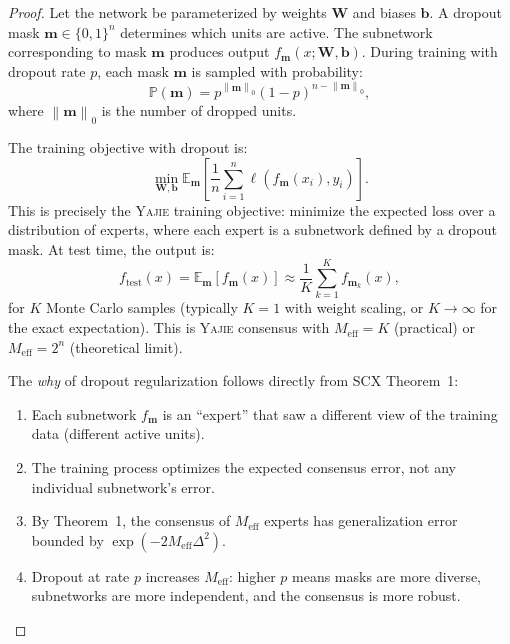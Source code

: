 \documentclass[12pt,a4paper]{article}
\theoremstyle{definition}
\newcommand{\Yajie}{\textsc{Yajie}}
\newcommand{\SCX}{\textsc{SCX}}
\newcommand{\E}{\mathbb{E}}
\newcommand{\Pbb}{\mathbb{P}}
\newcommand{\norm}[1]{\left\lVert#1\right\rVert}
\begin{document}
\begin{proof}
Let the network be parameterized by weights $\mathbf{W}$ and biases $\mathbf{b}$. A dropout mask $\mathbf{m} \in \{0,1\}^n$ determines which units are active. The subnetwork corresponding to mask $\mathbf{m}$ produces output $f_{\mathbf{m}}(x; \mathbf{W}, \mathbf{b})$. During training with dropout rate $p$, each mask $\mathbf{m}$ is sampled with probability:
\begin{equation}
    \Pbb(\mathbf{m}) = p^{\norm{\mathbf{m}}_0} (1-p)^{n - \norm{\mathbf{m}}_0},
\end{equation}
where $\norm{\mathbf{m}}_0$ is the number of dropped units.

The training objective with dropout is:
\begin{equation}
    \min_{\mathbf{W}, \mathbf{b}} \E_{\mathbf{m}}\left[\frac{1}{n}\sum_{i=1}^n \ell(f_{\mathbf{m}}(x_i), y_i)\right].
\end{equation}
This is precisely the \Yajie{} training objective: minimize the expected loss over a distribution of experts, where each expert is a subnetwork defined by a dropout mask. At test time, the output is:
\begin{equation}
    f_{\text{test}}(x) = \E_{\mathbf{m}}[f_{\mathbf{m}}(x)] \approx \frac{1}{K}\sum_{k=1}^K f_{\mathbf{m}_k}(x),
\end{equation}
for $K$ Monte Carlo samples (typically $K=1$ with weight scaling, or $K \to \infty$ for the exact expectation). This is \Yajie{} consensus with $M_{\text{eff}} = K$ (practical) or $M_{\text{eff}} = 2^n$ (theoretical limit).

The \emph{why} of dropout regularization follows directly from \SCX{} Theorem~1:
\begin{enumerate}
    \item Each subnetwork $f_{\mathbf{m}}$ is an ``expert'' that saw a different view of the training data (different active units).
    \item The training process optimizes the expected consensus error, not any individual subnetwork's error.
    \item By Theorem~1, the consensus of $M_{\text{eff}}$ experts has generalization error bounded by $\exp(-2M_{\text{eff}}\Delta^2)$.
    \item Dropout at rate $p$ increases $M_{\text{eff}}$: higher $p$ means masks are more diverse, subnetworks are more independent, and the consensus is more robust.
\end{enumerate}
\end{proof}
\end{document}
